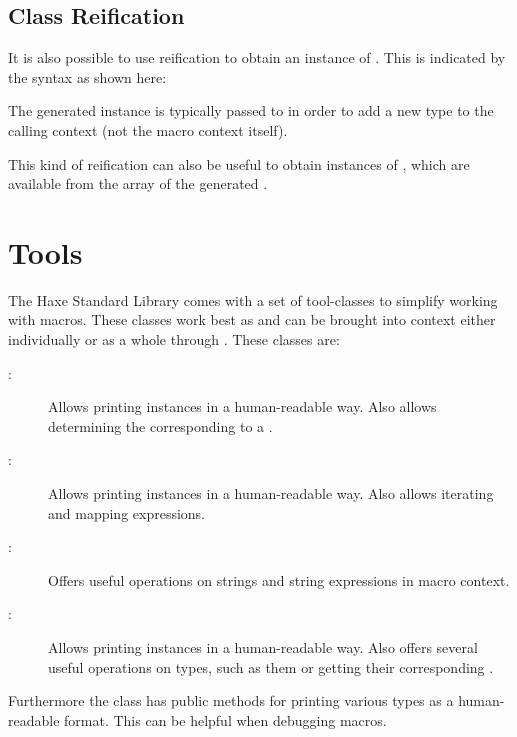 \subsection{Class Reification}
\label{macro-reification-class}

It is also possible to use reification to obtain an instance of . This is indicated by the  syntax as shown here:


The generated  instance is typically passed to  in order to add a new type to the calling context (not the macro context itself).

This kind of reification can also be useful to obtain instances of , which are available from the  array of the generated . 

\section{Tools}
\label{macro-tools}

The Haxe Standard Library comes with a set of tool-classes to simplify working with macros. These classes work best as  and can be brought into context either individually or as a whole through . These classes are:

\begin{description}
	\item[:] Allows printing  instances in a human-readable way. Also allows determining the  corresponding to a .
	\item[:] Allows printing  instances in a human-readable way. Also allows iterating and mapping expressions.
	\item[:] Offers useful operations on strings and string expressions in macro context.
	\item[:] Allows printing  instances in a human-readable way. Also offers several useful operations on types, such as  them or getting their corresponding .
\end{description}

Furthermore the  class has public methods for printing various types as a human-readable format. This can be helpful when debugging macros.

